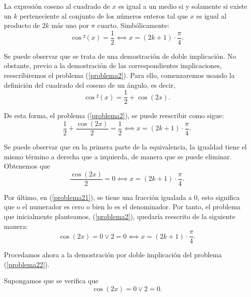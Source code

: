 \begin{lema}[SolucionCosenoCuadrado]La expresión coseno al
  cuadrado de \(x\) es igual a un medio si y solamente si
  existe un \(k\) perteneciente al conjunto de los números
  enteros tal que \(x\) es igual al producto de \(2k\) más
  uno por \(π\) cuarto. Simbólicamente:
  \begin{equation}\label{problema2}
    \cos²(x)=\frac{1}{2} ⟺ x=(2k+1)⋅\frac{π}{4}.
  \end{equation}
\end{lema}
\begin{demostracion}
  Se puede observar que se trata de una demostración de doble
  implicación. No obstante, previo a la demostración de las
  correspondientes implicaciones, reescribiremos el problema
  (\ref{problema2}). Para ello, comenzaremos usando la definición
  del cuadrado del coseno de un ángulo, es decir,
  \begin{equation}
    \cos²(x)=\frac{1}{2}+\cos(2x).
  \end{equation}

  De esta forma, el problema (\ref{problema2}), se puede reescribir
  como sigue:
  \begin{equation}
    \frac{1}{2}+\frac{\cos(2x)}{2}=\frac{1}{2} ⟺ x=(2k+1)⋅
    \frac{π}{4}.
  \end{equation}

  Se puede observar que en la primera parte de la equivalencia, la
  igualdad tiene el mismo término a derecha que a izquierda, de
  manera que se puede eliminar. Obtenemos que
  \begin{equation}\label{problema21}
    \frac{\cos(2x)}{2}=0 ⟺ x=(2k+1)⋅\frac{π}{4}.
  \end{equation}

  Por último, en (\ref{problema21}), se tiene una fracción igualada
  a 0, esto significa que o el numerador es cero o bien lo es el
  denominador. Por tanto, el problema que inicialmente planteamos,
  (\ref{problema2}), quedaría reescrito de la siguiente manera:
  \begin{equation}\label{problema22}
    \cos(2x)=0 \lor 2=0 ⟺ x=(2k+1)⋅\frac{π}{4}.
  \end{equation}

  Procedamos ahora a la demostración por doble implicación del
  problema (\ref{problema22}).

  \noindent
  \framebox{\longrightarrow} Supongamos que se verifica que
  \begin{equation}\label{Dobleh2}\tag{h1}
    \cos(2x)=0 \lor 2=0.
  \end{equation}


\end{demostracion}
